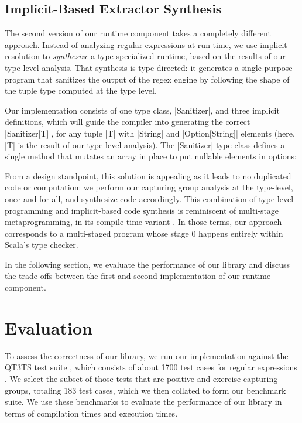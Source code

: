 \subsection{Implicit-Based Extractor Synthesis}
\label{subsec:implicit-based-extractor-synthesis}

The second version of our runtime component takes a completely different approach.
Instead of analyzing regular expressions at run-time, we use implicit resolution to \emph{synthesize} a type-specialized runtime, based on the results of our type-level analysis.
That synthesis is type-directed: it generates a single-purpose program that sanitizes the output of the regex engine by following the shape of the tuple type computed at the type level.

Our implementation consists of one type class, |Sanitizer|, and three implicit definitions, which will guide the compiler into generating the correct |Sanitizer[T]|, for any tuple |T| with |String| and |Option[String]| elements (here, |T| is the result of our type-level analysis).
The |Sanitizer| type class defines a single method that mutates an array in place to put nullable elements in options:

\regexSanitizerTypeClass

From a design standpoint, this solution is appealing as it leads to no duplicated code or computation: we perform our capturing group analysis at the type-level, once and for all, and synthesize code accordingly.
This combination of type-level programming and implicit-based code synthesis is reminiscent of multi-stage metaprogramming, in its com\-pile-time variant \citep{stucki2018practical}.
In those terms, our approach corresponds to a multi-staged program whose stage 0 happens entirely within Scala's type checker.

In the following section, we evaluate the performance of our library and discuss the trade-offs between the first and second implementation of our runtime component.

\section{Evaluation}
\label{sec:evaluation}

To assess the correctness of our library, we run our implementation against the QT3TS test suite \citep{w3c1994xquery}, which consists of about 1700 test cases for regular expressions \citep{w3c1994qt3ts}.
We select the subset of those tests that are positive and exercise capturing groups, totaling 183 test cases, which we then collated to form our benchmark suite.
We use these benchmarks to evaluate the performance of our library in terms of compilation times and execution times.

